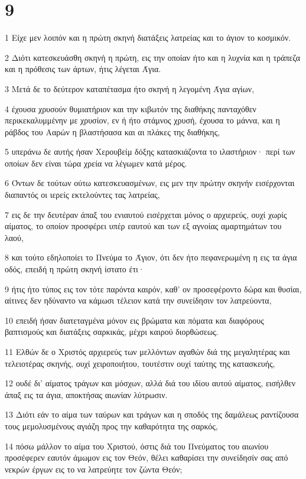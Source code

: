 \chapter{9}

\par 1 Είχε μεν λοιπόν και η πρώτη σκηνή διατάξεις λατρείας και το άγιον το κοσμικόν.
\par 2 Διότι κατεσκευάσθη σκηνή η πρώτη, εις την οποίαν ήτο και η λυχνία και η τράπεζα και η πρόθεσις των άρτων, ήτις λέγεται Άγια.
\par 3 Μετά δε το δεύτερον καταπέτασμα ήτο σκηνή η λεγομένη Άγια αγίων,
\par 4 έχουσα χρυσούν θυμιατήριον και την κιβωτόν της διαθήκης πανταχόθεν περικεκαλυμμένην με χρυσίον, εν ή ήτο στάμνος χρυσή, έχουσα το μάννα, και η ράβδος του Ααρών η βλαστήσασα και αι πλάκες της διαθήκης,
\par 5 υπεράνω δε αυτής ήσαν Χερουβείμ δόξης κατασκιάζοντα το ιλαστήριον· περί των οποίων δεν είναι τώρα χρεία να λέγωμεν κατά μέρος.
\par 6 Όντων δε τούτων ούτω κατεσκευασμένων, εις μεν την πρώτην σκηνήν εισέρχονται διαπαντός οι ιερείς εκτελούντες τας λατρείας,
\par 7 εις δε την δευτέραν άπαξ του ενιαυτού εισέρχεται μόνος ο αρχιερεύς, ουχί χωρίς αίματος, το οποίον προσφέρει υπέρ εαυτού και των εξ αγνοίας αμαρτημάτων του λαού,
\par 8 και τούτο εδηλοποίει το Πνεύμα το Άγιον, ότι δεν ήτο πεφανερωμένη η εις τα άγια οδός, επειδή η πρώτη σκηνή ίστατο έτι·
\par 9 ήτις ήτο τύπος εις τον τότε παρόντα καιρόν, καθ' ον προσεφέροντο δώρα και θυσίαι, αίτινες δεν ηδύναντο να κάμωσι τέλειον κατά την συνείδησιν τον λατρεύοντα,
\par 10 επειδή ήσαν διατεταγμένα μόνον εις βρώματα και πόματα και διαφόρους βαπτισμούς και διατάξεις σαρκικάς, μέχρι καιρού διορθώσεως.
\par 11 Ελθών δε ο Χριστός αρχιερεύς των μελλόντων αγαθών διά της μεγαλητέρας και τελειοτέρας σκηνής, ουχί χειροποιήτου, τουτέστιν ουχί ταύτης της κατασκευής,
\par 12 ουδέ δι' αίματος τράγων και μόσχων, αλλά διά του ιδίου αυτού αίματος, εισήλθεν άπαξ εις τα άγια, αποκτήσας αιωνίαν λύτρωσιν.
\par 13 Διότι εάν το αίμα των ταύρων και τράγων και η σποδός της δαμάλεως ραντίζουσα τους μεμολυσμένους αγιάζη προς την καθαρότητα της σαρκός,
\par 14 πόσω μάλλον το αίμα του Χριστού, όστις διά του Πνεύματος του αιωνίου προσέφερεν εαυτόν άμωμον εις τον Θεόν, θέλει καθαρίσει την συνείδησίν σας από νεκρών έργων εις το να λατρεύητε τον ζώντα Θεόν;

